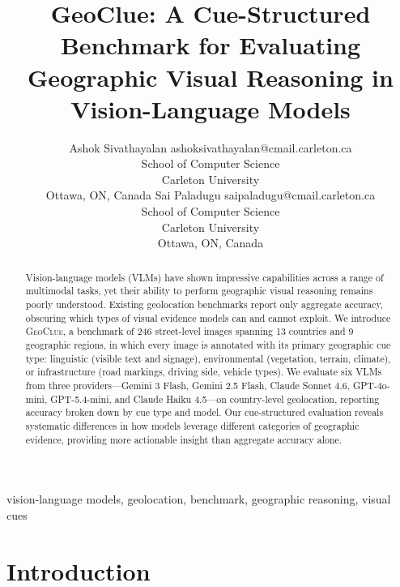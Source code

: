 \documentclass[twoside,11pt]{article}
\newcommand{\benchmark}{\textsc{GeoClue}}
\begin{document}
\title{GeoClue: A Cue-Structured Benchmark for Evaluating Geographic Visual Reasoning in Vision-Language Models}

\author{\name Ashok Sivathayalan \email ashoksivathayalan@cmail.carleton.ca \\
       \addr School of Computer Science\\
       Carleton University\\
       Ottawa, ON, Canada
       \AND
       \name Sai Paladugu \email saipaladugu@cmail.carleton.ca \\
       \addr School of Computer Science\\
       Carleton University\\
       Ottawa, ON, Canada}

\editor{}

\maketitle

\begin{abstract}
Vision-language models (VLMs) have shown impressive capabilities across a range of multimodal tasks, yet their ability to perform geographic visual reasoning remains poorly understood. Existing geolocation benchmarks report only aggregate accuracy, obscuring which types of visual evidence models can and cannot exploit. We introduce \benchmark{}, a benchmark of 246 street-level images spanning 13 countries and 9 geographic regions, in which every image is annotated with its primary geographic cue type: linguistic (visible text and signage), environmental (vegetation, terrain, climate), or infrastructure (road markings, driving side, vehicle types). We evaluate six VLMs from three providers---Gemini 3 Flash, Gemini 2.5 Flash, Claude Sonnet 4.6, GPT-4o-mini, GPT-5.4-mini, and Claude Haiku 4.5---on country-level geolocation, reporting accuracy broken down by cue type and model. Our cue-structured evaluation reveals systematic differences in how models leverage different categories of geographic evidence, providing more actionable insight than aggregate accuracy alone.
\end{abstract}

\begin{keywords}
  vision-language models, geolocation, benchmark, geographic reasoning, visual cues
\end{keywords}

\section{Introduction}
\label{sec:introduction}
\end{document}
